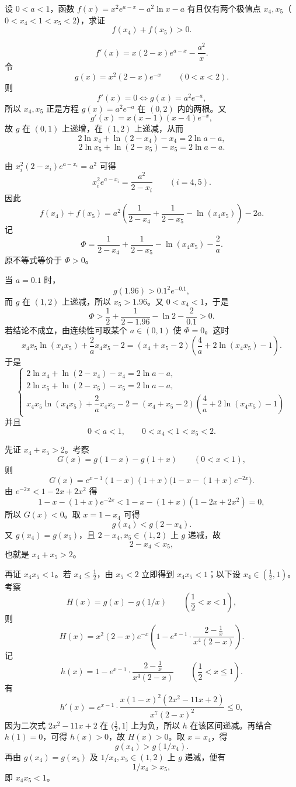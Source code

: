 \begin{example}[极值点比较]
设 \(0 < a < 1\)，函数 \(f(x) = x^2 e^{a-x} - a^2 \ln x - a\) 有且仅有两个极值点 \(x_4, x_5\)（\(0 < x_4 < 1 < x_5 < 2\)），求证
\[
f(x_4) + f(x_5) > 0.
\]
\end{example}
\begin{solution}
\[
f'(x) = x(2-x)e^{a-x} - \frac{a^2}{x}.
\]
令
\[
g(x)=x^2(2-x)e^{-x}\qquad(0<x<2).
\]
则
\[
f'(x)=0 \iff g(x)=a^2e^{-a},
\]
所以 \(x_4,x_5\) 正是方程 \(g(x)=a^2e^{-a}\) 在 \((0,2)\) 内的两根。又
\[
g'(x)=x(x-1)(x-4)e^{-x},
\]
故 \(g\) 在 \((0,1)\) 上递增，在 \((1,2)\) 上递减，从而
\[
2\ln x_4+\ln(2-x_4)-x_4=2\ln a-a,
\]
\[
2\ln x_5+\ln(2-x_5)-x_5=2\ln a-a.
\]

由 \(x_i^2(2-x_i)e^{a-x_i}=a^2\) 可得
\[
x_i^2e^{a-x_i}=\frac{a^2}{2-x_i}\qquad(i=4,5).
\]
因此
\[
f(x_4)+f(x_5)
=a^2\left(\frac{1}{2-x_4}+\frac{1}{2-x_5}-\ln(x_4x_5)\right)-2a.
\]
记
\[
\Phi=\frac{1}{2-x_4}+\frac{1}{2-x_5}-\ln(x_4x_5)-\frac{2}{a}.
\]
原不等式等价于 \(\Phi>0\)。

当 \(a=0.1\) 时，
\[
g(1.96)>0.1^2e^{-0.1},
\]
而 \(g\) 在 \((1,2)\) 上递减，所以 \(x_5>1.96\)。又 \(0<x_4<1\)，于是
\[
\Phi>\frac12+\frac{1}{2-1.96}-\ln2-\frac{2}{0.1}>0.
\]
若结论不成立，由连续性可取某个 \(a\in(0,1)\) 使 \(\Phi=0\)。这时
\[
x_4x_5\ln(x_4x_5)+\frac{2}{a}x_4x_5-2
=(x_4+x_5-2)\left(\frac{4}{a}+2\ln(x_4x_5)-1\right).
\]
于是
\[
\begin{cases}
2\ln x_4+\ln(2-x_4)-x_4=2\ln a-a, \\
2\ln x_5+\ln(2-x_5)-x_5=2\ln a-a, \\
x_4x_5\ln(x_4x_5)+\dfrac{2}{a}x_4x_5-2=(x_4+x_5-2)\left(\dfrac{4}{a}+2\ln(x_4x_5)-1\right)
\end{cases}
\]
并且
\[
0<a<1,\qquad 0<x_4<1<x_5<2.
\]

先证 \(x_4+x_5>2\)。考察
\[
G(x)=g(1-x)-g(1+x)\qquad(0<x<1),
\]
则
\[
G(x)=e^{x-1}(1-x)(1+x)\bigl(1-x-(1+x)e^{-2x}\bigr).
\]
由 \(e^{-2x}<1-2x+2x^2\) 得
\[
1-x-(1+x)e^{-2x}<1-x-(1+x)(1-2x+2x^2)=0,
\]
所以 \(G(x)<0\)。取 \(x=1-x_4\) 可得
\[
g(x_4)<g(2-x_4).
\]
又 \(g(x_4)=g(x_5)\)，且 \(2-x_4,x_5\in(1,2)\) 上 \(g\) 递减，故
\[
2-x_4<x_5,
\]
也就是 \(x_4+x_5>2\)。

再证 \(x_4x_5<1\)。若 \(x_4\le \frac12\)，由 \(x_5<2\) 立即得到 \(x_4x_5<1\)；以下设 \(x_4\in(\frac12,1)\)。考察
\[
H(x)=g(x)-g(1/x)\qquad\left(\frac12<x<1\right),
\]
则
\[
H(x)=x^2(2-x)e^{-x}\left(1-e^{x-1}\cdot\frac{2-\frac1x}{x^4(2-x)}\right).
\]
记
\[
h(x)=1-e^{x-1}\cdot\frac{2-\frac1x}{x^4(2-x)}\qquad\left(\frac12<x\le1\right).
\]
有
\[
h'(x)=e^{x-1}\cdot\frac{x(1-x)^2(2x^2-11x+2)}{x^7(2-x)^2}\le0,
\]
因为二次式 \(2x^2-11x+2\) 在 \((\frac12,1]\) 上为负，所以 \(h\) 在该区间递减。再结合 \(h(1)=0\)，可得 \(h(x)>0\)，故 \(H(x)>0\)。取 \(x=x_4\)，得
\[
g(x_4)>g(1/x_4).
\]
再由 \(g(x_4)=g(x_5)\) 及 \(1/x_4,x_5\in(1,2)\) 上 \(g\) 递减，便有
\[
1/x_4>x_5,
\]
即 \(x_4x_5<1\)。


\end{solution}
